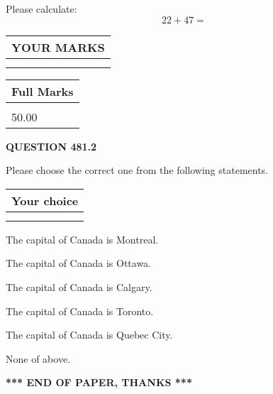 \documentclass[12pt]{article}
\begin{document}
  
 
Please calculate:
\begin{equation}
22 +  %
47 = \nonumber
\end{equation}
 

 

 
  
\vspace{0.2in}
  
\noindent\begin{tabular}{|l|}
\hline
 YOUR MARKS  \\
\hline
 \\ 
 \\ 
\hline
\end{tabular}
\hspace{0.05in} \begin{tabular}{|l|}
\hline
 Full Marks  \\
\hline
 \\ 
50.00 \\
\hline
\end{tabular}
{\textbf{\Large{QUESTION
481.2 
}}}
  
  
Please choose the correct one from the following statements.
  
  
\noindent\hspace{3.0in} \begin{tabular}{|l|}
\hline
Your choice \\
\hline
 \\ 
 \\ 
\hline
\end{tabular}
  
  
 
 
The capital of Canada is Montreal.
 
 
The capital of Canada is Ottawa.
 
 
The capital of Canada is Calgary.
 
 
The capital of Canada is Toronto.
 
 
The capital of Canada is Quebec City.
 
 
 None of above.
 
 
   
   
 \vspace{0.2in}
 
   
   
   
   
\vspace{1.0in} 
{\textbf{\large{ *** END OF PAPER, THANKS *** }}} 
   
\end{document}
